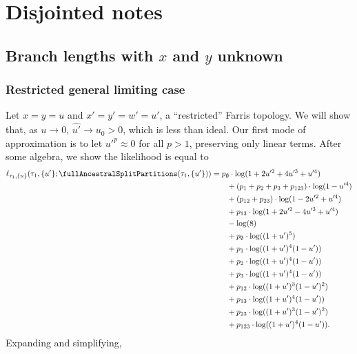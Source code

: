 \section{Disjointed notes}

\subsection{Branch lengths with $x$ and $y$ unknown}

\subsubsection{Restricted general limiting case}

Let $x=y=u$ and $x'=y'=w'=u'$, a ``restricted'' Farris topology.
We will show that, as $u\rightarrow 0$, $\hat{u'}\rightarrow u_0 > 0$, which is less than ideal.
Our first mode of approximation is to let $u'^p\approx 0$ for all $p > 1$, preserving only linear terms.
After some algebra, we show the likelihood is equal to
\begin{align*}
    \ell_{\tau_1,\{u\}}(\tau_1, \{u'\}; \fullAncestralSplitPartitions(\tau_1,\{u'\}))
    &=        p_{\emptyset}  \cdot\log(1+2u'^2+4u'^3+u'^4) \\
    &\qquad + (p_{1}+p_{2}+p_{3}+p_{123})          \cdot\log(1-u'^4) \\
    &\qquad + (p_{12}+p_{23})         \cdot\log(1-2u'^2+u'^4) \\
    &\qquad + p_{13}         \cdot\log(1+2u'^2-4u'^3+u'^4) \\
    &\qquad - \log(8) \\
    &\qquad + p_{\emptyset}  \cdot\log((1+u')^5)\\
    &\qquad + p_{1}          \cdot\log((1+u')^4(1-u'))\\
    &\qquad + p_{2}          \cdot\log((1+u')^4(1-u'))\\
    &\qquad + p_{3}          \cdot\log((1+u')^4(1-u'))\\
    &\qquad + p_{12}         \cdot\log((1+u')^3(1-u')^2)\\
    &\qquad + p_{13}         \cdot\log((1+u')^4(1-u'))\\
    &\qquad + p_{23}         \cdot\log((1+u')^3(1-u')^2)\\
    &\qquad + p_{123}        \cdot\log((1+u')^4(1-u')).
\end{align*}
Expanding and simplifying,
